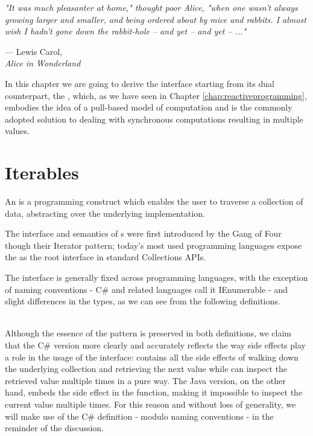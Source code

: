 \let\textcircled=\pgftextcircled
{}

\epigraph{\hspace{4ex}\textit{"It was much pleasanter at home," thought poor Alice, "when one wasn't always growing larger and smaller, and being ordered about by mice and rabbits. I almost wish I hadn't gone down the rabbit-hole -- and yet -- and yet -- ..."}}{--- Lewis Carol,\\ \textit{Alice in Wonderland}}


In this chapter we are going to derive the  interface starting from its dual counterpart, the , which, as we have seen in Chapter \ref{chap:reactiveprogramming}, embodies the idea of a pull-based model of computation and is the commonly adopted solution to dealing with synchronous computations resulting in multiple values.

\section{Iterables}
\label{sec:iterables}

An  is a programming construct which enables the user to traverse a collection of data, abstracting over the underlying implementation\cite{gamma1995design}.

The interface and semantics of s were first introduced by the Gang of Four though their Iterator pattern\cite{gamma1995design}; today's most used programming languages expose the  as the root interface in standard Collections APIs. 

The  interface is generally fixed across programming languages, with the exception of naming conventions - C\# and related languages call it IEnumerable - and slight differences in the types, as we can see from the following definitions.\\

\\

Although the essence of the pattern is preserved in both definitions, we claim that the C\# version more clearly and accurately reflects the way side effects play a role in the usage of the interface:  contains all the side effects of walking down the underlying collection and retrieving the next value while  can inspect the retrieved value multiple times in a pure way. The Java version, on the other hand, embeds the side effect in the  function, making it impossible to inspect the current value multiple times. For this reason and without loss of generality, we will make use of the C\# definition - modulo naming conventions - in the reminder of the discussion.\\

